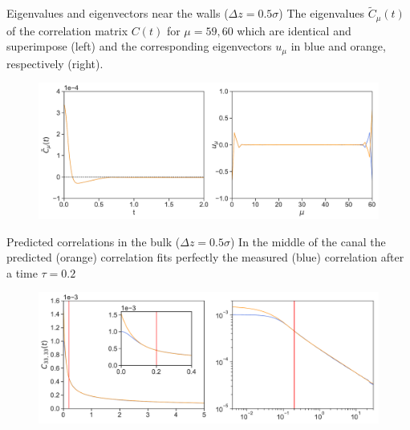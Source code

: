\documentclass{beamer}
\begin{document}
\begin{frame}{Eigenvalues and eigenvectors near the walls ($\Delta z=0.5\sigma$)}
    The eigenvalues $\tilde{C}_{\mu}(t)$ of the correlation matrix $C(t)$ for $\mu=59,60$ which are identical and superimpose (left) and the corresponding eigenvectors $u_{\mu}$ in blue and orange, respectively (right).
  \begin{figure}[h!]
\includegraphics[width=\linewidth]{EigenvaluesVectors-WALLS-66nodes}
\end{figure}
\end{frame}

\begin{frame}{Predicted correlations in the bulk ($\Delta z=0.5\sigma$)}
  In the middle of the canal the predicted (orange) correlation fits perfectly the measured (blue) correlation after a time $\tau=0.2$
\begin{figure}[h!]
\includegraphics[width=\linewidth]{Predictions-canal-WALLS-66nodes-defense}
\end{figure}
\end{frame}
\end{document}
